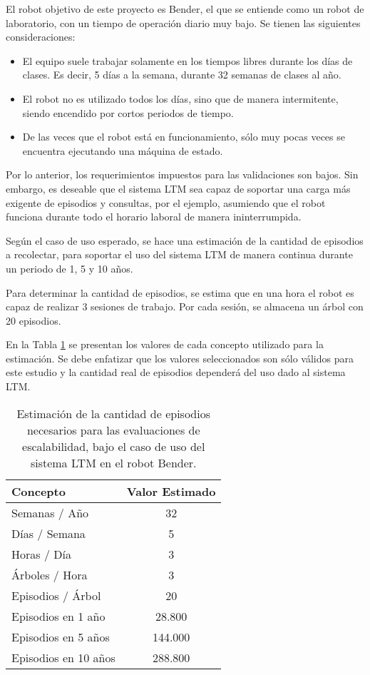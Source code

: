 El robot objetivo de este proyecto es Bender, el que se entiende como un robot de laboratorio, con un tiempo de operación diario muy bajo. Se tienen las siguientes consideraciones:
\begin{itemize}
\item El equipo suele trabajar solamente en los tiempos libres durante los días de clases. Es decir, 5 días a la semana, durante 32 semanas de clases al año.
\item El robot no es utilizado todos los días, sino que de manera intermitente, siendo encendido por cortos periodos de tiempo.
\item De las veces que el robot está en funcionamiento, sólo muy pocas veces se encuentra ejecutando una máquina de estado.
\end{itemize}

Por lo anterior, los requerimientos impuestos para las validaciones son bajos. Sin embargo, es deseable que el sistema LTM sea capaz de soportar una carga más exigente de episodios y consultas, por el ejemplo, asumiendo que el robot funciona durante todo el horario laboral de manera ininterrumpida.

Según el caso de uso esperado, se hace una estimación de la cantidad de episodios a recolectar, para soportar el uso del sistema LTM de manera continua durante un periodo de 1, 5 y 10 años. 

Para determinar la cantidad de episodios, se estima que en una hora el robot es capaz de realizar 3 sesiones de trabajo. Por cada sesión, se almacena un árbol con 20 episodios. 

En la Tabla \ref{table:escalabilidad} se presentan los valores de cada concepto utilizado para la estimación. Se debe enfatizar que los valores seleccionados son sólo válidos para este estudio y la cantidad real de episodios dependerá del uso dado al sistema LTM.

\begin{table}[H]
	\centering
	\begin{tabular}{|l|c|}
		\hline
		\rowcolor{gray!50}
		Concepto & Valor Estimado \\ \hline
		Semanas / Año	&  32 \\  \hline
		Días / Semana	&  5 \\  \hline
		Horas / Día     &  3 \\  \hline
		Árboles / Hora  &  3 \\  \hline
		Episodios / Árbol & 20 \\  \hline \hline
		Episodios en 1 año  & 28.800  \\  \hline 
		Episodios en 5 años  & 144.000  \\  \hline 
		Episodios en 10 años  & 288.800  \\  \hline 		
	\end{tabular} 
	\caption[Estimaciones para validación de escalabilidad]
	{\small Estimación de la cantidad de episodios necesarios para las evaluaciones de escalabilidad, bajo el caso de uso del sistema LTM en el robot Bender.}
	\label{table:escalabilidad}
\end{table}


